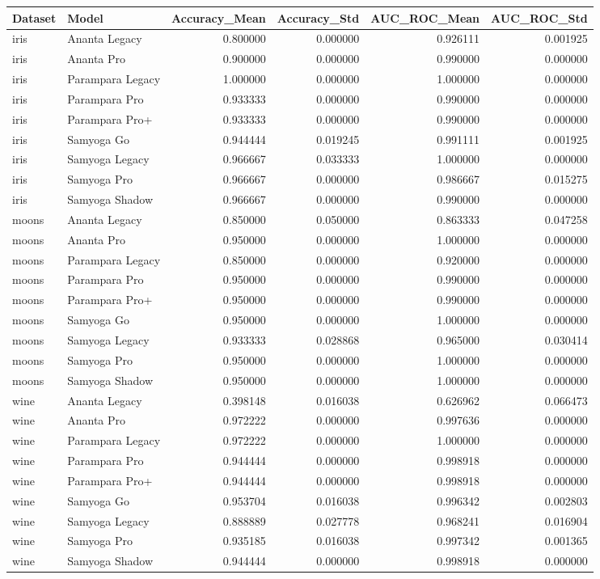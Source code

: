 \begin{tabular}{llrrrr}
\toprule
Dataset & Model & Accuracy_Mean & Accuracy_Std & AUC_ROC_Mean & AUC_ROC_Std \\
\midrule
iris & Ananta Legacy & 0.800000 & 0.000000 & 0.926111 & 0.001925 \\
iris & Ananta Pro & 0.900000 & 0.000000 & 0.990000 & 0.000000 \\
iris & Parampara Legacy & 1.000000 & 0.000000 & 1.000000 & 0.000000 \\
iris & Parampara Pro & 0.933333 & 0.000000 & 0.990000 & 0.000000 \\
iris & Parampara Pro+ & 0.933333 & 0.000000 & 0.990000 & 0.000000 \\
iris & Samyoga Go & 0.944444 & 0.019245 & 0.991111 & 0.001925 \\
iris & Samyoga Legacy & 0.966667 & 0.033333 & 1.000000 & 0.000000 \\
iris & Samyoga Pro & 0.966667 & 0.000000 & 0.986667 & 0.015275 \\
iris & Samyoga Shadow & 0.966667 & 0.000000 & 0.990000 & 0.000000 \\
moons & Ananta Legacy & 0.850000 & 0.050000 & 0.863333 & 0.047258 \\
moons & Ananta Pro & 0.950000 & 0.000000 & 1.000000 & 0.000000 \\
moons & Parampara Legacy & 0.850000 & 0.000000 & 0.920000 & 0.000000 \\
moons & Parampara Pro & 0.950000 & 0.000000 & 0.990000 & 0.000000 \\
moons & Parampara Pro+ & 0.950000 & 0.000000 & 0.990000 & 0.000000 \\
moons & Samyoga Go & 0.950000 & 0.000000 & 1.000000 & 0.000000 \\
moons & Samyoga Legacy & 0.933333 & 0.028868 & 0.965000 & 0.030414 \\
moons & Samyoga Pro & 0.950000 & 0.000000 & 1.000000 & 0.000000 \\
moons & Samyoga Shadow & 0.950000 & 0.000000 & 1.000000 & 0.000000 \\
wine & Ananta Legacy & 0.398148 & 0.016038 & 0.626962 & 0.066473 \\
wine & Ananta Pro & 0.972222 & 0.000000 & 0.997636 & 0.000000 \\
wine & Parampara Legacy & 0.972222 & 0.000000 & 1.000000 & 0.000000 \\
wine & Parampara Pro & 0.944444 & 0.000000 & 0.998918 & 0.000000 \\
wine & Parampara Pro+ & 0.944444 & 0.000000 & 0.998918 & 0.000000 \\
wine & Samyoga Go & 0.953704 & 0.016038 & 0.996342 & 0.002803 \\
wine & Samyoga Legacy & 0.888889 & 0.027778 & 0.968241 & 0.016904 \\
wine & Samyoga Pro & 0.935185 & 0.016038 & 0.997342 & 0.001365 \\
wine & Samyoga Shadow & 0.944444 & 0.000000 & 0.998918 & 0.000000 \\
\bottomrule
\end{tabular}
